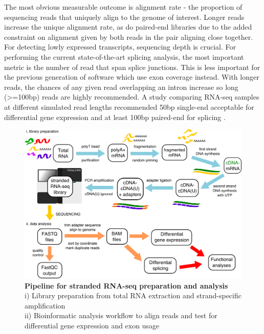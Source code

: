 The most obvious measurable outcome is alignment rate - the proportion of sequencing reads that uniquely align to the genome of interest. 
Longer reads increase the unique alignment rate, as do paired-end libraries due to the added constraint on alignment given by both reads in the pair aligning close together. 
For detecting lowly expressed transcripts, sequencing depth is crucial. 
For performing the current state-of-the-art splicing analysis, the most important metric is the number of read that span splice junctions. 
This is less important for the previous generation of software which use exon coverage instead.
With longer reads, the chances of any given read overlapping an intron increase so long (>=100bp) reads are highly recommended.
A study comparing RNA-seq samples at different simulated read lengths recommended 50bp single-end acceptable for differential gene expression and at least 100bp paired-end for splicing \citep{Chhangawala2015}. %


\begin{figure}[h!]
	\begin{center}
		\includegraphics[width=14cm]{Figures/02_methods/RNAseq_pipeline_schematic.png}
	\end{center}
	\caption[Pipeline for stranded RNA-seq preparation and analysis]{
		\textbf{Pipeline for stranded RNA-seq preparation and analysis}\\
	i) Library preparation from total RNA extraction and strand-specific amplification\\
	ii) Bioinformatic analysis workflow to align reads and test for differential gene expression and exon usage
	}
\end{figure}

